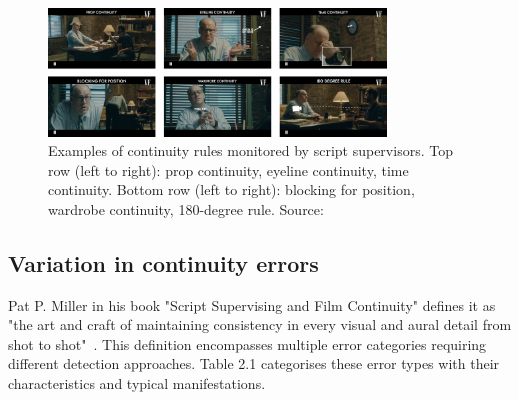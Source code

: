 \begin{figure}[h]
\centering
\includegraphics[width=0.8\textwidth]{figures/VF-Continuity.png}
\caption{Examples of continuity rules monitored by script supervisors. Top row (left to right): prop continuity, eyeline continuity, time continuity. Bottom row (left to right): blocking for position, wardrobe continuity, 180-degree rule. Source:~\cite{vanityfair2023}}
\label{fig:continuity-examples}
\end{figure}

\subsection{Variation in continuity errors}

Pat P. Miller in his book "Script Supervising and Film Continuity" defines it as "the art and craft of maintaining consistency in every visual and aural detail from shot to shot"~\cite{warm2008}. This definition encompasses multiple error categories requiring different detection approaches. Table 2.1 categorises these error types with their characteristics and typical manifestations.

